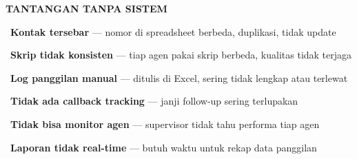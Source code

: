 \documentclass[a4paper]{article}
\begin{document}
\noindent
\begin{minipage}[t]{0.485\textwidth}
    \colorbox{RedLight}{%
        \begin{minipage}{\dimexpr\textwidth-14pt}
            \vspace{5pt}
            {\fontsize{10}{13}\selectfont\bfseries\color{RedText} TANTANGAN TANPA SISTEM}
            \vspace{5pt}
        \end{minipage}}
    \vspace{6pt}

    {\fontsize{9.5}{13}\selectfont\color{TextDark}%
    \textbullet\ \textbf{Kontak tersebar} --- nomor di spreadsheet berbeda, duplikasi, tidak update\par\vspace{4pt}%
    \textbullet\ \textbf{Skrip tidak konsisten} --- tiap agen pakai skrip berbeda, kualitas tidak terjaga\par\vspace{4pt}%
    \textbullet\ \textbf{Log panggilan manual} --- ditulis di Excel, sering tidak lengkap atau terlewat\par\vspace{4pt}%
    \textbullet\ \textbf{Tidak ada callback tracking} --- janji follow-up sering terlupakan\par\vspace{4pt}%
    \textbullet\ \textbf{Tidak bisa monitor agen} --- supervisor tidak tahu performa tiap agen\par\vspace{4pt}%
    \textbullet\ \textbf{Laporan tidak real-time} --- butuh waktu untuk rekap data panggilan}%
\end{minipage}%
\hfill%
\end{document}
